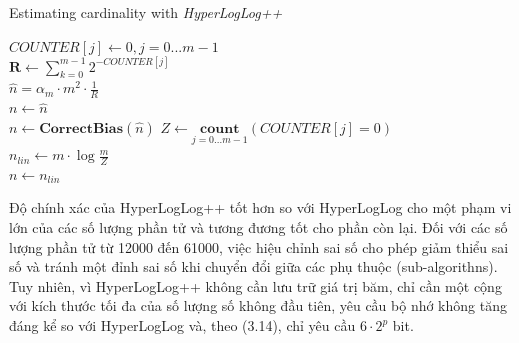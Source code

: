 \documentclass[letterpaper,13pt]{article}
\theoremstyle{mytheor}
\begin{document}
\begin{algorithm}[H]
    \vspace{0.25cm}
    \DontPrintSemicolon
    \LinesNumberedHidden
    \caption[]{Estimating cardinality with \textit{HyperLogLog++}}
    $COUNTER[j] \gets 0, j = 0 ... m-1$\\
    $\textbf{R} \gets \sum\limits_{k=0}^{m-1}2^{-COUNTER[j]}$\\
    $\hat{n} = \alpha_m \cdot m^2 \cdot \frac{1}{R}$\\
    $n \gets \hat{n}$\\
    {
        $n \gets \textbf{CorrectBias}(\hat{n})$
    }
    $Z \gets \underset{j=0...m-1}{\textbf{count}}(COUNTER[j] = 0)$\\
    {
        $n_{lin} \gets m \cdot \log\frac{m}{Z}$\\
        {
            $n \gets n_{lin}$
        }
    }
    \vspace{0.25cm}
\end{algorithm}

Độ chính xác của HyperLogLog++ tốt hơn so với HyperLogLog cho một phạm vi lớn của các số lượng phần tử và tương đương tốt cho phần còn lại. 
Đối với các số lượng phần tử từ 12000 đến 61000, việc hiệu chỉnh sai số cho phép giảm thiểu sai số và tránh một đỉnh sai số khi chuyển đổi 
giữa các phụ thuộc (sub-algorithns).\\
Tuy nhiên, vì HyperLogLog++ không cần lưu trữ giá trị băm, chỉ cần một cộng với kích thước tối đa của số lượng số không đầu tiên, yêu cầu bộ nhớ 
không tăng đáng kể so với HyperLogLog và, theo (3.14), chỉ yêu cầu $6 \cdot 2^p$ bit.\\
\end{document}
